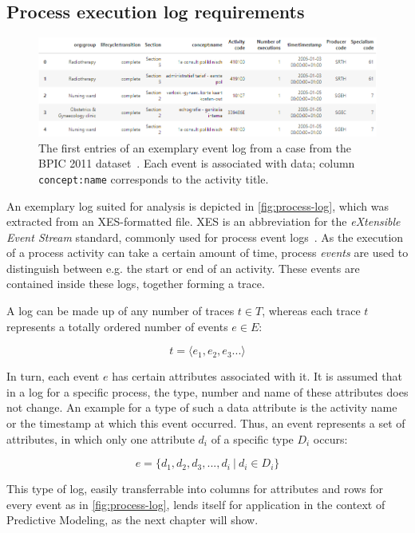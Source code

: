 \subsection{Process execution log requirements}\label{sec:log-structure}
\begin{figure}
    \centering
    \includegraphics[width=\textwidth]{gfx/process-log.png}
    \caption{The first entries of an exemplary event log from a case from the BPIC 2011 dataset~\cite{BPIC2011}. Each event is associated with data; column \texttt{concept:name} corresponds to the activity title.}
    \label{fig:process-log}
\end{figure}

An exemplary log suited for analysis is depicted in \autoref{fig:process-log}, which was extracted from an XES-formatted file.
XES is an abbreviation for the \textit{eXtensible Event Stream} standard, commonly used for process event logs~\cite{gunther2013xes}. As the execution of a process activity can take a certain amount of time, process \textit{events} are used to distinguish between e.g. the start or end of an activity. These events are contained inside these logs, together forming a trace.

A log can be made up of any number of traces $t \in T$, whereas each trace $t$ represents a totally ordered number of events $e \in E$:

$$ t = \langle e_1, e_2, e_3 ... \rangle $$

In turn, each event $e$ has certain attributes associated with it. It is assumed that in a log for a specific process, the type, number and name of these attributes does not change. An example for a type of such a data attribute is the activity name or the timestamp at which this event occurred. Thus, an event represents a set of attributes, in which only one attribute $d_i$ of a specific type $D_i$ occurs:

$$ e = \{ d_1, d_2, d_3, ..., d_i\ |\ d_i \in D_i \}$$

This type of log, easily transferrable into columns for attributes and rows for every event as in \autoref{fig:process-log}, lends itself for application in the context of Predictive Modeling, as the next chapter will show.

